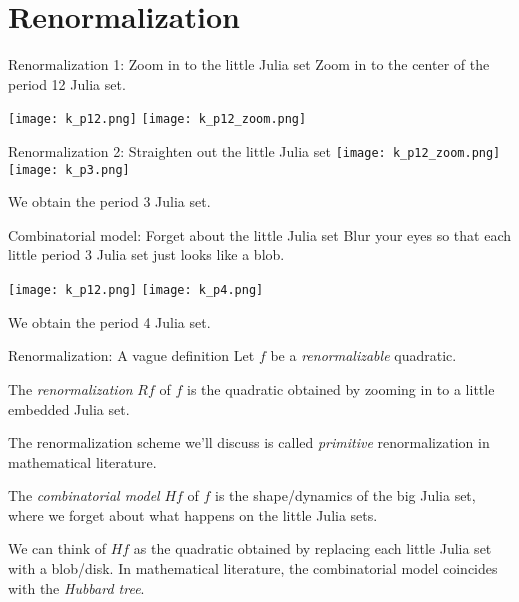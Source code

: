 \documentclass{beamer}
\begin{document}
\section{Renormalization}

\begin{frame}{Renormalization 1: Zoom in to the little Julia set}
\centering
Zoom in to the center of the period 12 Julia set.

\texttt{[image: k\_p12.png]}
\texttt{[image: k\_p12\_zoom.png]}
\end{frame}

\begin{frame}{Renormalization 2: Straighten out the little Julia set}
\centering
\texttt{[image: k\_p12\_zoom.png]}
\texttt{[image: k\_p3.png]}

We obtain the period 3 Julia set.
\end{frame}

\begin{frame}{Combinatorial model: Forget about the little Julia set}
\centering
Blur your eyes so that each little period 3 Julia set just looks like a blob.

\texttt{[image: k\_p12.png]}
\texttt{[image: k\_p4.png]}

We obtain the period 4 Julia set.
\end{frame}

\begin{frame}{Renormalization: A vague definition}
Let $f$ be a \emph{renormalizable} quadratic.
\begin{definition}
The \emph{renormalization} $Rf$ of $f$ is the quadratic obtained by zooming in to a little embedded Julia set.
\end{definition}
The renormalization scheme we'll discuss is called \emph{primitive} renormalization in mathematical literature.
\begin{definition}
The \emph{combinatorial model} $Hf$ of $f$ is the shape/dynamics of the big Julia set, where we forget about what happens on the little Julia sets.
\end{definition}
We can think of $Hf$ as the quadratic obtained by replacing each little Julia set with a blob/disk. In mathematical literature, the combinatorial model coincides with the \emph{Hubbard tree}.
\end{frame}
\end{document}
